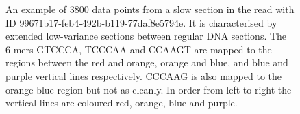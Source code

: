 \begin{figure}
\centering

\caption{\label{fig:slow-section}An example of 3800 data points from a slow section in the read with ID 99671b17-feb4-492b-b119-77daf8e5794e. It is characterised by extended low-variance sections between regular DNA sections. The 6-mers GTCCCA, TCCCAA and CCAAGT are mapped to the regions between the red and orange, orange and blue, and blue and purple vertical lines respectively. CCCAAG is also mapped to the orange-blue region but not as cleanly. In order from left to right the vertical lines are coloured red, orange, blue and purple.}
\end{figure}
